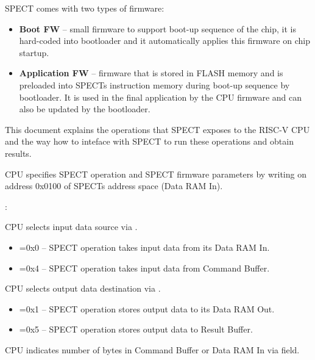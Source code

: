 SPECT comes with two types of firmware:
\begin{itemize}
    \item \textbf{Boot FW} -- small firmware to support boot-up sequence of the chip, it is hard-coded into bootloader and
          it automatically applies this firmware on chip startup.
    \item \textbf{Application FW} -- firmware that is stored in FLASH memory and is preloaded into SPECTs instruction memory during
                                     boot-up sequence by bootloader. It is used in the final application by the CPU firmware and
                                     can also be updated by the bootloader.
\end{itemize}

This document explains the operations that SPECT exposes to the RISC-V CPU and the way how to inteface with SPECT
to run these operations and obtain results.

\clearpage
{}

CPU specifies SPECT operation and SPECT firmware parameters by writing\linebreak
{} on address 0x0100 of SPECTs address space (Data RAM In).

\vspace{.3cm}
:



CPU selects input data source via .
\begin{itemize}
    \item {}=0x0 -- SPECT operation takes input data from its Data RAM In.
    \item {}=0x4 -- SPECT operation takes input data from Command Buffer.
\end{itemize}

CPU selects output data destination via .
\begin{itemize}
    \item {}=0x1 -- SPECT operation stores output data to its Data RAM Out.
    \item {}=0x5 -- SPECT operation stores output data to Result Buffer.
\end{itemize}

CPU indicates number of bytes in Command Buffer or Data RAM In via \linebreak
{} field.

